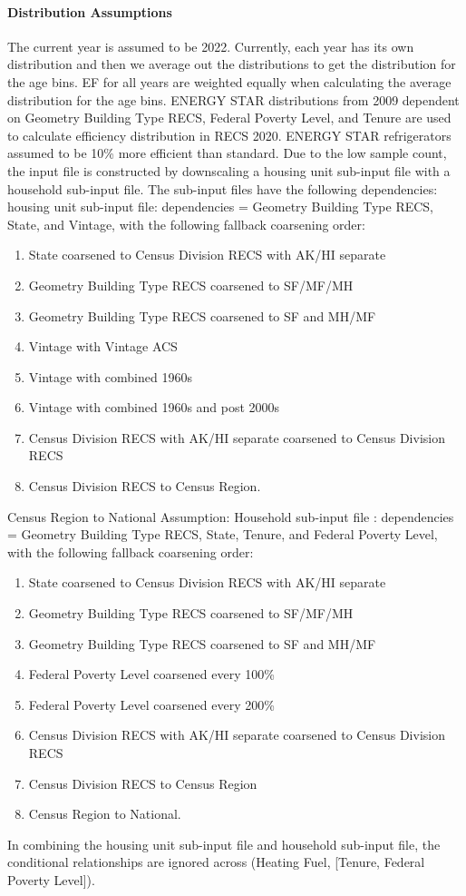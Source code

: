 

\paragraph{Distribution Assumptions}
% 
The current year is assumed to be 2022. 
Currently, each year has its own distribution and then we average out the distributions to get the distribution for the age bins. EF for all years are weighted equally when calculating the average distribution for the age bins. ENERGY STAR distributions from 2009 dependent on Geometry Building Type RECS, Federal Poverty Level, and Tenure are used to calculate efficiency distribution in RECS 2020. ENERGY STAR refrigerators assumed to be 10\% more efficient than standard. Due to the low sample count, the input file is constructed by downscaling a housing unit sub-input file with a household sub-input file. The sub-input files have the following dependencies: housing unit sub-input file: dependencies = Geometry Building Type RECS, State, and Vintage, with the following fallback coarsening order: 
\begin{enumerate}
    \item  State coarsened to Census Division RECS with AK/HI separate 
    \item Geometry Building Type RECS coarsened to SF/MF/MH 
\item Geometry Building Type RECS coarsened to SF and MH/MF 
\item Vintage with Vintage ACS 
\item Vintage with combined 1960s 
\item Vintage with combined 1960s and post 2000s 
\item Census Division RECS with AK/HI separate coarsened to Census Division RECS
\item Census Division RECS to Census Region.
\end{enumerate}
Census Region to National Assumption: Household sub-input file : dependencies = Geometry Building Type RECS, State, Tenure, and Federal Poverty Level, with the following fallback coarsening order:
\begin{enumerate}
\item State coarsened to Census Division RECS with AK/HI separate
\item Geometry Building Type RECS coarsened to SF/MF/MH 
\item  Geometry Building Type RECS coarsened to SF and MH/MF 
\item  Federal Poverty Level coarsened every 100\% 
\item  Federal Poverty Level coarsened every 200\% 
\item Census Division RECS with AK/HI separate coarsened to Census Division RECS 
\item Census Division RECS to Census Region 
\item Census Region to National. 

\end{enumerate}
In combining the housing unit sub-input file and household sub-input file, the conditional relationships are ignored across (Heating Fuel, [Tenure, Federal Poverty Level]).
